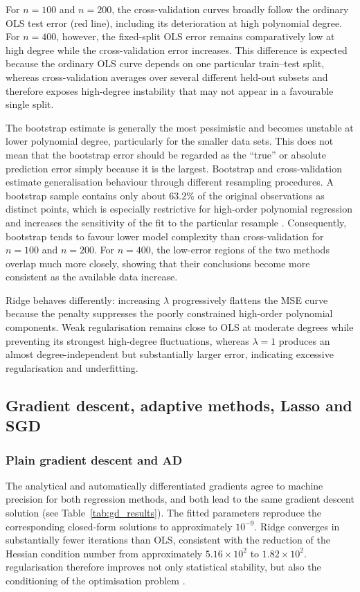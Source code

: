 \documentclass[aps,rmp,reprint,amsmath,amssymb,graphicx,longbibliography]{revtex4-1}
\begin{document}
For $n=100$ and $n=200$, the cross-validation curves broadly follow the
ordinary OLS test error (red line), including its deterioration at high polynomial
degree. For $n=400$, however, the fixed-split OLS error remains comparatively
low at high degree while the cross-validation error increases. This difference
is expected because the ordinary OLS curve depends on one particular
train--test split, whereas cross-validation averages over several different
held-out subsets and therefore exposes high-degree instability that may not
appear in a favourable single split.

The bootstrap estimate is generally the most pessimistic and becomes unstable
at lower polynomial degree, particularly for the smaller data sets. This does
not mean that the bootstrap error should be regarded as the ``true'' or
absolute prediction error simply because it is the largest. Bootstrap and
cross-validation estimate generalisation behaviour through different
resampling procedures. A bootstrap sample contains only about $63.2\%$ of the
original observations as distinct points, which is especially restrictive for
high-order polynomial regression and increases the sensitivity of the fit to
the particular resample \cite{HjorthJensen2026MLPSCh2}. Consequently,
bootstrap tends to favour lower model complexity than cross-validation for
$n=100$ and $n=200$. For $n=400$, the low-error regions of the two methods
overlap much more closely, showing that their conclusions become more
consistent as the available data increase.

Ridge behaves differently: increasing $\lambda$ progressively flattens the MSE
curve because the penalty suppresses the poorly constrained high-order
polynomial components. Weak regularisation remains close to OLS at moderate
degrees while preventing its strongest high-degree fluctuations, whereas
$\lambda=1$ produces an almost degree-independent but substantially larger
error, indicating excessive regularisation and underfitting. 

\subsection{Gradient descent, adaptive methods, Lasso and SGD}

\subsubsection*{Plain gradient descent and AD}

The analytical and automatically differentiated gradients agree to machine
precision for both regression methods, and both lead to the same gradient
descent solution (see Table~\ref{tab:gd_results}). The fitted parameters reproduce
the corresponding closed-form solutions to approximately $10^{-9}$. Ridge
converges in substantially fewer iterations than OLS, consistent with the
reduction of the Hessian condition number from approximately $5.16\times10^2$
to $1.82\times10^2$. regularisation therefore improves not only statistical
stability, but also the conditioning of the optimisation problem
\cite{HjorthJensen2026MLPSCh4}.
\end{document}
